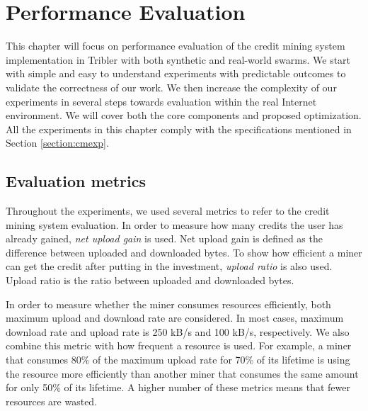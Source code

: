 \chapter{Performance Evaluation}
\label{chp:perfeval}

This chapter will focus on performance evaluation of the credit mining system implementation in Tribler with both synthetic and real-world swarms. We start with simple and easy to understand experiments with predictable outcomes to validate the correctness of our work. We then increase the complexity of our experiments in several steps towards evaluation within the real Internet environment. We will cover both the core components and proposed optimization. All the experiments in this chapter comply with the specifications mentioned in Section \ref{section:cmexp}. 
\vspace{-0.3cm}
\section{Evaluation metrics}
\label{section:evalmetrics}
Throughout the experiments, we used several metrics to refer to the credit mining system evaluation. In order to measure how many credits the user has already gained, \textit{net upload gain}\cite{2015:creditmining:capota} is used. Net upload gain is defined as the difference between uploaded and downloaded bytes. To show how efficient a miner can get the credit after putting in the investment, \textit{upload ratio} is also used. Upload ratio is the ratio between uploaded and downloaded bytes.

In order to measure whether the miner consumes resources efficiently, both maximum upload and download rate are considered. In most cases, maximum download rate and upload rate is 250 kB/s and 100 kB/s, respectively. We also combine this metric with how frequent a resource is used. For example, a miner that consumes 80\% of the maximum upload rate for 70\% of its lifetime is using the resource more efficiently than another miner that consumes the same amount for only 50\% of its lifetime. A higher number of these metrics means that fewer resources are wasted. 

\vspace{-0.3cm}
